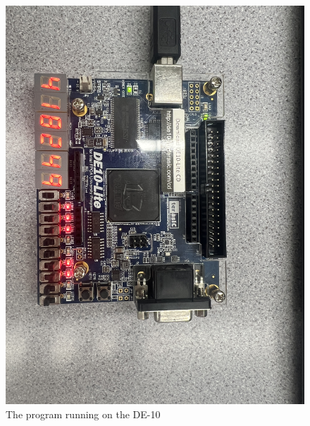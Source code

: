 \documentclass{article}
\begin{document}
\begin{flushleft}
\begin{figure}[!h]
\begin{centering}
      \includegraphics[scale=0.2]{IMG_3757.jpeg}
      \caption{The program running on the DE-10}
    \end{centering}
  \end{figure}
  \begin{figure}[!h]
    \begin{centering}

\end{centering}
\end{figure}
\end{flushleft}
\end{document}
